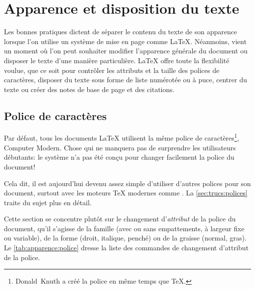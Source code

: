\chapter{Apparence et disposition du texte}
\label{chap:apparence}

Les bonnes pratiques dictent de séparer le contenu du texte de son
apparence lorsque l'on utilise un système de mise en page comme
{\LaTeX}. Néanmoins, vient un moment où l'on peut souhaiter modifier
l'apparence générale du document ou disposer le texte d'une manière
particulière. {\LaTeX} offre toute la flexibilité voulue, que ce soit
pour contrôler les attributs et la taille des polices de caractères,
disposer du texte sous forme de liste numérotée ou à puce, centrer du
texte ou créer des notes de base de page et des citations.

\section{Police de caractères}
\label{sec:apparence:police}

Par défaut, tous les documents {\LaTeX} utilisent la même police de
caractères\footnote{%
  Donald~Knuth a créé la police en même temps que {\TeX}.}, %
{\selectfont Computer Modern}. Chose qui ne manquera
pas de surprendre les utilisateurs débutants: le système n'a pas été
conçu pour changer facilement la police du document!

Cela dit, il est aujourd'hui devenu assez simple d'utiliser d'autres
polices pour son document, surtout avec les moteurs
{\TeX} modernes comme {\XeTeX}. La \autoref{sec:trucs:polices} traite
du sujet plus en détail.

Cette section se concentre plutôt sur le changement d'\emph{attribut}
de la police du document, qu'il s'agisse de la famille (avec ou sans
empattements, à largeur fixe ou variable), de la forme (droit,
italique, penché) ou de la graisse (normal, gras). Le
\autoref{tab:apparence:police} dresse la liste des commandes de
changement d'attribut de la police.

